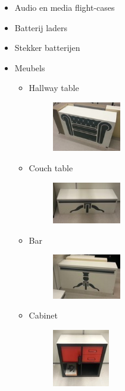 \documentclass[a4paper,10pt]{article}
\numberwithin{equation}{section}
\numberwithin{figure}{section}
\numberwithin{table}{section}
\begin{document}
\begin{itemize}
	\item Audio en media flight-cases
	\item Batterij laders
	\item Stekker batterijen
	\item Meubels
		\begin{itemize}
			\item Hallway table
			
				\begin{figure}[H]
					\centering
					\includegraphics[width=0.3\textwidth]{Figures/hallwaytable}
				\end{figure}
			
			\item Couch table
				\begin{figure}[H]
					\centering
					\includegraphics[width=0.3\textwidth]{Figures/couchtable}
				\end{figure}			
			
			\item Bar
				\begin{figure}[H]
					\centering
					\includegraphics[width=0.3\textwidth]{Figures/bar}
				\end{figure}			
			
			\item Cabinet
					\begin{figure}[H]
						\centering
						\includegraphics[width=0.25\textwidth]{Figures/cabinet}
					\end{figure}	
			

\end{itemize}
\end{itemize}
\end{document}
